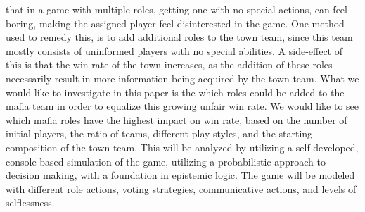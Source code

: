that in a game with multiple roles, getting one with no special actions, can 
feel boring, making the assigned player feel disinterested in the game. One 
method used to remedy this, is to add additional roles to the town team, since 
this team mostly consists of uninformed players with no special abilities. A 
side-effect of this is that the win rate of the town increases, as the addition 
of these roles necessarily result in more information being acquired by the 
town team. What we would like to investigate in this paper is the which roles 
could be added to the mafia team in order to equalize this growing unfair win 
rate. We would like to see which mafia roles have the highest impact on win 
rate, based on the number of initial players, the ratio of teams, different 
play-styles, and the starting composition of the town team. 
This will be analyzed by utilizing a self-developed, console-based simulation 
of the game, utilizing a probabilistic approach to decision making, with a 
foundation in epistemic logic. The game will be modeled with different role 
actions, voting strategies, communicative actions, and levels of selflessness.
